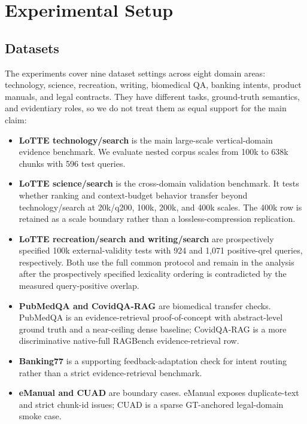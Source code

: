 
\section{Experimental Setup}
\label{sec:05-experimental-setup:experimental-setup}

\subsection{Datasets}
\label{sec:05-experimental-setup:datasets}

The experiments cover nine dataset settings across eight domain areas: technology, science, recreation, writing, biomedical QA, banking intents, product manuals, and legal contracts. They have different tasks, ground-truth semantics, and evidentiary roles, so we do not treat them as equal support for the main claim:

\begin{itemize}
\item \textbf{LoTTE technology/search} is the main large-scale vertical-domain evidence benchmark. We evaluate nested corpus scales from 100k to 638k chunks with 596 test queries.
\item \textbf{LoTTE science/search} is the cross-domain validation benchmark. It tests whether ranking and context-budget behavior transfer beyond technology/search at 20k/q200, 100k, 200k, and 400k scales. The 400k row is retained as a scale boundary rather than a lossless-compression replication.
\item \textbf{LoTTE recreation/search and writing/search} are prospectively specified 100k external-validity tests with 924 and 1,071 positive-qrel queries, respectively. Both use the full common protocol and remain in the analysis after the prospectively specified lexicality ordering is contradicted by the measured query-positive overlap.
\item \textbf{PubMedQA and CovidQA-RAG} are biomedical transfer checks. PubMedQA is an evidence-retrieval proof-of-concept with abstract-level ground truth and a near-ceiling dense baseline; CovidQA-RAG is a more discriminative native-full RAGBench evidence-retrieval row.
\item \textbf{Banking77} is a supporting feedback-adaptation check for intent routing rather than a strict evidence-retrieval benchmark.
\item \textbf{eManual and CUAD} are boundary cases. eManual exposes duplicate-text and strict chunk-id issues; CUAD is a sparse GT-anchored legal-domain smoke case.
\end{itemize}

